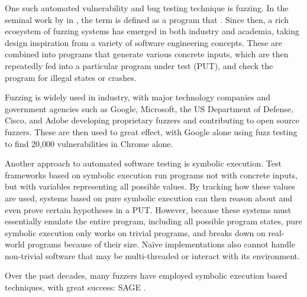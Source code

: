 \documentclass{article}
\begin{document}
\begin{multicols}{2}
    One such automated vulnerability and bug testing technique is fuzzing.\cite{VulnerabilityDiscoveryTechniques} In the seminal work by \citeauthor{UNIX} in \citeyear{UNIX}, the term  is defined as a program that \cite{UNIX}. Since then, a rich ecosystem of fuzzing systems has emerged in both industry and academia, taking design inspiration from a variety of software engineering concepts. These are combined into programs that generate various concrete inputs, which are then repeatedly fed into a particular program under test (PUT), and check the program for illegal states or crashes.\cite{EvaluatingFuzzTesting}

    Fuzzing is widely used in industry, with major technology companies and government agencies such as Google, Microsoft, the US Department of Defense, Cisco, and Adobe developing proprietary fuzzers and contributing to open source fuzzers. These are then used to great effect, with Google alone using fuzz testing to find 20,000 vulnerabilities in Chrome alone.\cite{Demystifying}

    Another approach to automated software testing is symbolic execution\cite{Symbex}. Test frameworks based on symbolic execution run programs not with concrete inputs, but with variables representing all possible values. By tracking how these values are used, systems based on pure symbolic execution can then reason about and even prove certain hypotheses in a PUT. However, because these systems must essentially emulate the entire program, including all possible program states, pure symbolic execution only works on trivial programs, and breaks down on real-world programs because of their size. Naïve implementations also cannot handle non-trivial software that may be multi-threaded or interact with its environment.

    Over the past decades, many fuzzers\cite{1dVul, AGLT, APLS, ASSIE, AUTOGRAM, Angora, BBRBP, BORG, BitBlaze, BugMiner, CESE, CORAL, CORALAVM, CRAXfuzz, CREST, CUTE, Chopped, Cinger, Cloud9, Cyberdyne, DART, DDCSE, DTSA, Darwin, DeepFuzz, DiSE, DigFuzz, Dowser, Driller, DrillerGo, EXE, Eclipser, FUZZOLIC, Fitnex, FloPSy, GRT, GSE, HCT, HFL, HigherOrderTestGeneration, HybridFuzzTesting, IFL, Intriguer, JFS, KATCH, KLEE, KLEEFP, LATEST, MATRIXRELOADED, MCSS, MEUZZ, Mayhem, MoWF, Moles, OpenDistributedPrograms, PFA, PYGMALION, Pangolin, Pex, QSYM, QuickFuzz, REDQUEEN, RWset, RaceDetection, S2E, SAGE, SAVIOR, SMART, SPIN, SRA, SYMFUZZ, ScalableAutomatedMethods, Stinger, TCR, TFuzz, TaintScope, VUzzer, WEIZZ} have employed symbolic execution based techniques, with great success: SAGE\cite{SAGE} \cite{FuzzingTheStateOfTheArt}.


\end{multicols}
\end{document}
